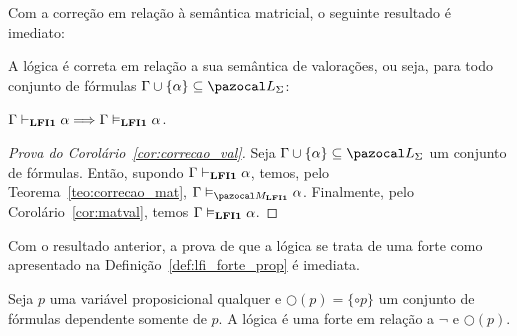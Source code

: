         Com a correção em relação à semântica matricial, o seguinte resultado é imediato:


        \begin{corolario}\label{cor:correcao_val}
            A lógica {\normalfont\lfium{}} é correta em relação a sua semântica de valorações, ou seja, para todo conjunto de fórmulas $\Gamma \cup \{\alpha\} \subseteq \ling{}$:

            \centering
            {\normalfont{} $\Gamma \vdash_{{\normalfont\textbf{LFI1}}{}} \alpha \Longrightarrow \Gamma \vDash_{{\normalfont\textbf{LFI1}}{}} \alpha$.}
        \end{corolario}

        \begin{proof}[Prova do Corolário~\ref{cor:correcao_val}]
            Seja $\Gamma \cup \{\alpha\} \subseteq \ling{}$ um conjunto de fórmulas. Então, supondo $\Gamma \vdash_{{\normalfont\textbf{LFI1}}{}} \alpha$, temos, pelo Teorema~\ref{teo:correcao_mat}, $\Gamma \conmat \alpha$. Finalmente, pelo Corolário~\ref{cor:matval}, temos $\Gamma \vDash_{{\normalfont\textbf{LFI1}}{}} \alpha$.
        \end{proof}

        Com o resultado anterior, a prova de que a lógica \lfium{} se trata de uma \lfi{} forte como apresentado na Definição~\ref{def:lfi_forte_prop} é imediata.

        \begin{corolario}\label{cor:lfi_forte}
            Seja $p$ uma variável proposicional qualquer e $\bigcirc(p) = \{\circ p\}$ um conjunto de fórmulas dependente somente de $p$. A lógica \lfium{} é uma \lfi{} forte em relação a $\neg$ e $\bigcirc(p)$.
        \end{corolario}

